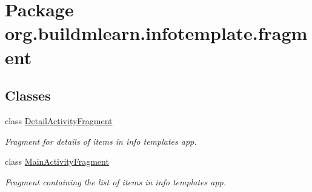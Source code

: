 \hypertarget{namespaceorg_1_1buildmlearn_1_1infotemplate_1_1fragment}{}\section{Package org.\+buildmlearn.\+infotemplate.\+fragment}
\label{namespaceorg_1_1buildmlearn_1_1infotemplate_1_1fragment}
\subsection*{Classes}
\begin{DoxyCompactItemize}
\item 
class \hyperlink{classorg_1_1buildmlearn_1_1infotemplate_1_1fragment_1_1DetailActivityFragment}{Detail\+Activity\+Fragment}
\begin{DoxyCompactList}\small\item\em Fragment for details of items in info template\textquotesingle{}s app. \end{DoxyCompactList}\item 
class \hyperlink{classorg_1_1buildmlearn_1_1infotemplate_1_1fragment_1_1MainActivityFragment}{Main\+Activity\+Fragment}
\begin{DoxyCompactList}\small\item\em Fragment containing the list of items in info template\textquotesingle{}s app. \end{DoxyCompactList}\end{DoxyCompactItemize}
